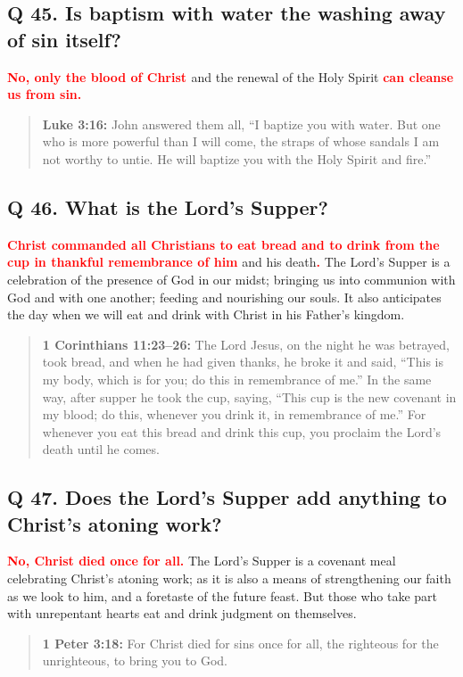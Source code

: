 \documentclass[titlepage]{memoir}
\newcommand\Children[1]{\textbf{\textcolor{red}{#1}}}
\newcommand\Quote[2]{\begin{quote}{\small\textbf{#1:}{ #2}}\end{quote}}
\begin{document}
\subsection{Q 45. Is baptism with water the washing away of sin itself?}
\Children{No, only the blood of Christ }and the renewal of the Holy Spirit \Children{can cleanse us from sin.}

\Quote{Luke 3:16}{John answered them all, ``I baptize you with water. But one who is more powerful than I will come, the straps of whose sandals I am not worthy to untie. He will baptize you with the Holy Spirit and fire.''}

\subsection{Q 46. What is the Lord's Supper?}
\Children{Christ commanded all Christians to eat bread and to drink from the cup in thankful remembrance of him} and his death\Children{.} The Lord's Supper is a celebration of the presence of God in our midst; bringing us into communion with God and with one another; feeding and nourishing our souls. It also anticipates the day when we will eat and drink with Christ in his Father's kingdom.

\Quote{1 Corinthians 11:23--26}{The Lord Jesus, on the night he was betrayed, took bread, and when he had given thanks, he broke it and said, ``This is my body, which is for you; do this in remembrance of me.'' In the same way, after supper he took the cup, saying, ``This cup is the new covenant in my blood; do this, whenever you drink it, in remembrance of me.'' For whenever you eat this bread and drink this cup, you proclaim the Lord's death until he comes.}

\subsection{Q 47. Does the Lord's Supper add anything to Christ's atoning work?}
\Children{No, Christ died once for all.} The Lord's Supper is a covenant meal celebrating Christ's atoning work; as it is also a means of strengthening our faith as we look to him, and a foretaste of the future feast. But those who take part with unrepentant hearts eat and drink judgment on themselves.

\Quote{1 Peter 3:18}{For Christ died for sins once for all, the righteous for the unrighteous, to bring you to God.}
\end{document}
